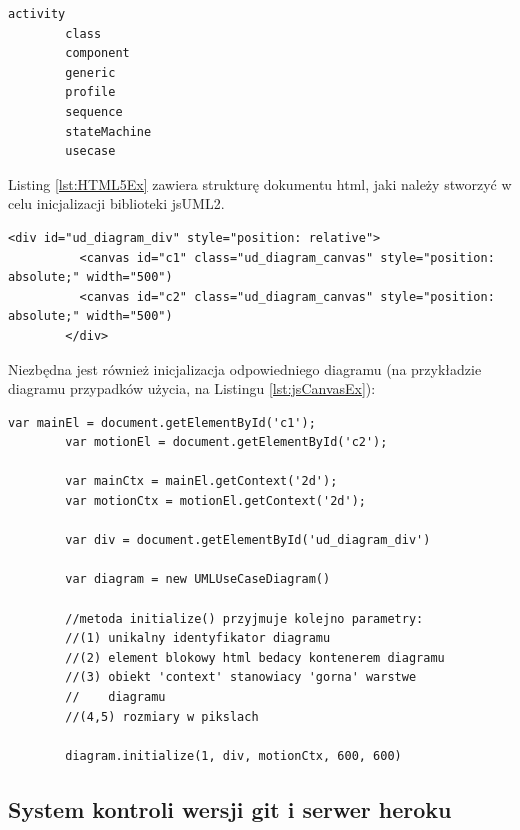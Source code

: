         \begin{lstlisting}[caption={Pakiety modułów jsUML2}, label={lst:UDModules}]
        activity
        class
        component
        generic
        profile
        sequence
        stateMachine
        usecase
        \end{lstlisting}

        Listing \ref{lst:HTML5Ex} zawiera strukturę dokumentu html, jaki należy stworzyć w celu inicjalizacji biblioteki jsUML2.

        \begin{lstlisting}[caption={HTML canvas element}, label={lst:HTML5Ex}]
        <div id="ud_diagram_div" style="position: relative">
          <canvas id="c1" class="ud_diagram_canvas" style="position: absolute;" width="500")
          <canvas id="c2" class="ud_diagram_canvas" style="position: absolute;" width="500")
        </div>
        \end{lstlisting}
      
        \newpage
      
        Niezbędna jest również inicjalizacja odpowiedniego diagramu (na przykładzie diagramu przypadków użycia, na Listingu \ref{lst:jsCanvasEx}):

        \begin{lstlisting}[caption={HTML canvas element - JS}, label={lst:jsCanvasEx}]
        var mainEl = document.getElementById('c1');
        var motionEl = document.getElementById('c2');

        var mainCtx = mainEl.getContext('2d');
        var motionCtx = motionEl.getContext('2d');

        var div = document.getElementById('ud_diagram_div')

        var diagram = new UMLUseCaseDiagram()

        //metoda initialize() przyjmuje kolejno parametry:
        //(1) unikalny identyfikator diagramu
        //(2) element blokowy html bedacy kontenerem diagramu
        //(3) obiekt 'context' stanowiacy 'gorna' warstwe
        //    diagramu
        //(4,5) rozmiary w pikslach 

        diagram.initialize(1, div, motionCtx, 600, 600) 
        \end{lstlisting}

\subsection{System kontroli wersji git i serwer heroku}
  
